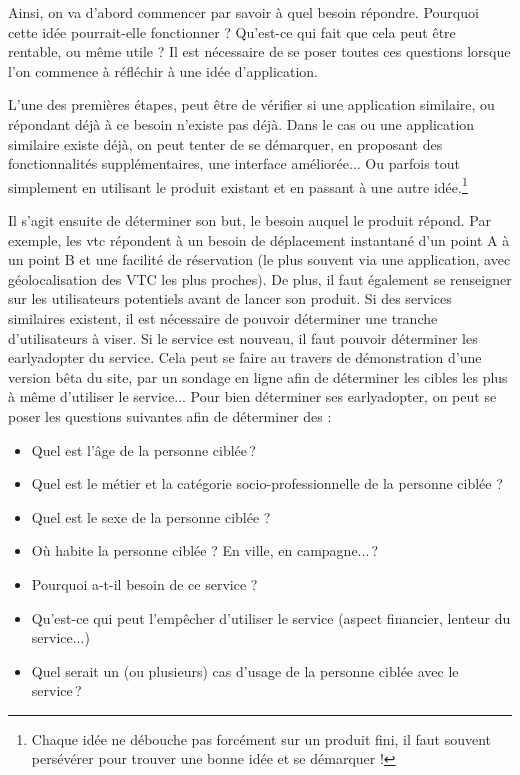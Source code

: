 Ainsi, on va d'abord commencer par savoir à quel besoin répondre. Pourquoi cette idée pourrait-elle fonctionner ? Qu'est-ce qui fait que cela peut être rentable, ou même utile ? Il est nécessaire de se poser toutes ces questions lorsque l'on commence à réfléchir à une idée d'application.

L'une des premières étapes, peut être de vérifier si une application similaire, ou répondant déjà à ce besoin n'existe pas déjà. Dans le cas ou une application similaire existe déjà, on peut tenter de se démarquer, en proposant des fonctionnalités supplémentaires, une interface améliorée... Ou parfois tout simplement en utilisant le produit existant et en passant à une autre idée.\footnote{Chaque idée ne débouche pas forcément sur un produit fini, il faut souvent persévérer pour trouver une bonne idée et se démarquer !}

Il s'agit ensuite de déterminer son but, le besoin auquel le produit répond. Par exemple, les \gls{vtc} répondent à un besoin de déplacement instantané d'un point A à un point B et une facilité de réservation (le plus souvent via une application, avec géolocalisation des VTC les plus proches). De plus, il faut également se renseigner sur les utilisateurs potentiels avant de lancer son produit. Si des services similaires existent, il est nécessaire de pouvoir déterminer une tranche d'utilisateurs à viser. Si le service est nouveau, il faut pouvoir déterminer les \gls{earlyadopter} du service. Cela peut se faire au travers de démonstration d'une version bêta du site, par un sondage en ligne afin de déterminer les cibles les plus à même d'utiliser le service... Pour bien déterminer ses \gls{earlyadopter}, on peut se poser les questions suivantes afin de déterminer des  : 

\begin{itemize}
	\setlength\itemsep{-0.5em}
	\item Quel est l'âge de la personne ciblée ?
	\item Quel est le métier et la catégorie socio-professionnelle de la personne ciblée ?
	\item Quel est le sexe de la personne ciblée ? 
	\item Où habite la personne ciblée ? En ville, en campagne... ? 
	\item Pourquoi a-t-il besoin de ce service ? 
	\item Qu'est-ce qui peut l'empêcher d'utiliser le service (aspect financier, lenteur du service...) 
	\item Quel serait un (ou plusieurs) cas d'usage de la personne ciblée avec le service ?
\end{itemize}


